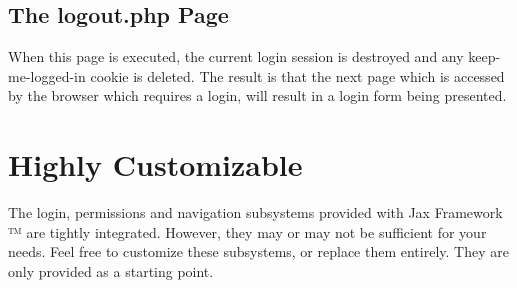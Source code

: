 \documentclass[letterpaper,10pt,english]{sphinxmanual}
\begin{document}
\subsection{The logout.php Page}
\label{jaxFrameworkGuide:the-logout-php-page}
When this page is executed, the current login session is destroyed and any keep-me-logged-in cookie
is deleted.  The result is that the next page which is accessed by the browser which requires a
login, will result in a login form being presented.


\section{Highly Customizable}
\label{jaxFrameworkGuide:highly-customizable}
The login, permissions and navigation subsystems provided with Jax Framework ™ are tightly
integrated.  However, they may or may not be sufficient for your needs.  Feel free to customize
these subsystems, or replace them entirely.  They are only provided as a starting point.



\renewcommand{\indexname}{Index}
\printindex
\end{document}
